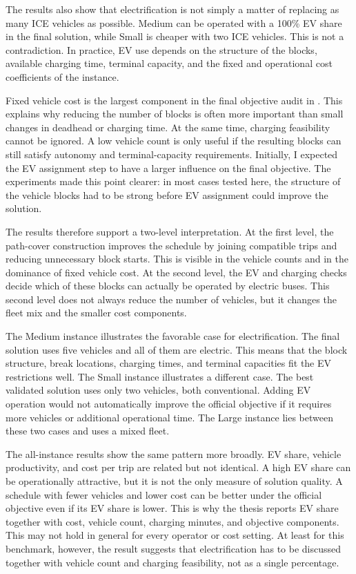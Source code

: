 The results also show that electrification is not simply a matter of replacing
as many ICE vehicles as possible.  Medium can be operated with a 100\% EV share
in the final solution, while Small is cheaper with two ICE vehicles.  This is
not a contradiction.  In practice, EV use depends on the structure of the
blocks, available charging time, terminal capacity, and the fixed and
operational cost coefficients of the instance.

Fixed vehicle cost is the largest component in the final objective audit in
.  This explains why reducing the number of blocks is
often more important than small changes in deadhead or charging time.  At the
same time, charging feasibility cannot be ignored.  A low vehicle count is only
useful if the resulting blocks can still satisfy autonomy and terminal-capacity
requirements.
Initially, I expected the EV assignment step to have a larger influence on the
final objective.  The experiments made this point clearer: in most cases tested
here, the structure of the vehicle blocks had to be strong before EV assignment
could improve the solution.

The results therefore support a two-level interpretation.  At the first level,
the path-cover construction improves the schedule by joining compatible trips
and reducing unnecessary block starts.  This is visible in the vehicle counts
and in the dominance of fixed vehicle cost.  At the second level, the EV and
charging checks decide which of these blocks can actually be operated by
electric buses.  This second level does not always reduce the number of
vehicles, but it changes the fleet mix and the smaller cost components.

The Medium instance illustrates the favorable case for electrification.  The
final solution uses five vehicles and all of them are electric.  This means that
the block structure, break locations, charging times, and terminal capacities
fit the EV restrictions well.  The Small instance illustrates a different case.
The best validated solution uses only two vehicles, both conventional.  Adding
EV operation would not automatically improve the official objective if it
requires more vehicles or additional operational time.  The Large instance lies
between these two cases and uses a mixed fleet.

The all-instance results show the same pattern more broadly.  EV share,
vehicle productivity, and cost per trip are related but not identical.  A high
EV share can be operationally attractive, but it is not the only measure of
solution quality.  A schedule with fewer vehicles and lower cost can be better
under the official objective even if its EV share is lower.  This is why the
thesis reports EV share together with cost, vehicle count, charging minutes,
and objective components.
This may not hold in general for every operator or cost setting.  At least for
this benchmark, however, the result suggests that electrification has to be
discussed together with vehicle count and charging feasibility, not as a single
percentage.

